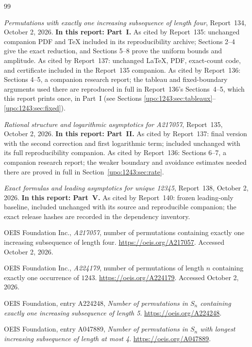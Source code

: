 \documentclass[11pt,letterpaper]{article}
\theoremstyle{remark}\newtheorem{remark}[theorem]{Remark}
\numberwithin{equation}{section}
\begin{document}
\clearpage
\begingroup
\small
\begin{thebibliography}{99}
\emph{Permutations with exactly one increasing subsequence of length four}, Report~134, October 2, 2026. \textbf{In this report: Part~I.} As cited by Report~135: unchanged companion PDF and TeX included in its reproducibility archive; Sections 2--4 give the exact reduction, and Sections 5--8 prove the uniform bounds and amplitude. As cited by Report~137: unchanged \LaTeX, PDF, exact-count code, and certificate included in the Report~135 companion. As cited by Report~136: Sections 4--5, a companion research report; the tableau and fixed-boundary arguments used there are reproduced in full in Report~136's Sections~4--5, which this report prints once, in Part~I (see Sections \ref{upo:1243:sec:tableaux}--\ref{upo:1243:sec:fixed}).

\emph{Rational structure and logarithmic asymptotics for A217057}, Report~135, October 2, 2026. \textbf{In this report: Part~II.} As cited by Report~137: final version with the second correction and first logarithmic term; included unchanged with its full reproducibility companion. As cited by Report~136: Sections 6--7, a companion research report; the weaker boundary and avoidance estimates needed there are proved in full in Section~\ref{upo:1243:sec:rate}.

\emph{Exact formulas and leading asymptotics for unique 12345}, Report~138, October 2, 2026. \textbf{In this report: Part~V.} As cited by Report~140: frozen leading-only baseline, included unchanged with its source and reproducible companion; the exact release hashes are recorded in the dependency inventory.

OEIS Foundation Inc., \emph{A217057}, number of permutations containing exactly one increasing subsequence of length four. \url{https://oeis.org/A217057}. Accessed October 2, 2026.

OEIS Foundation Inc., \emph{A224179}, number of permutations of length $n$ containing exactly one occurrence of $1243$. \url{https://oeis.org/A224179}. Accessed October 2, 2026.

OEIS Foundation, entry A224248, \emph{Number of permutations in $S_n$ containing exactly one increasing subsequence of length 5}. \url{https://oeis.org/A224248}.

OEIS Foundation, entry A047889, \emph{Number of permutations in $S_n$ with longest increasing subsequence of length at most 4}. \url{https://oeis.org/A047889}.


\end{thebibliography}
\end{document}
